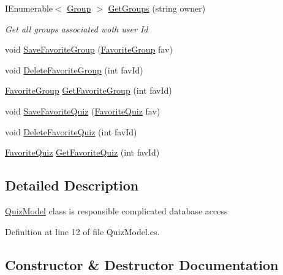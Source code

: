 \begin{DoxyCompactItemize}
I\+Enumerable$<$ \hyperlink{class_website_1_1_models_1_1_group}{Group} $>$ \hyperlink{class_website_1_1_models_1_1_quiz_model_a16f6ac52bca29f569a4c403d9fdcdd29}{Get\+Groups} (string owner)
\begin{DoxyCompactList}\small\item\em Get all groups associated woth user Id \end{DoxyCompactList}\item 
void \hyperlink{class_website_1_1_models_1_1_quiz_model_a91252f69e6932544dfb25fc0e8363f96}{Save\+Favorite\+Group} (\hyperlink{class_website_1_1_models_1_1_favorite_group}{Favorite\+Group} fav)
\item 
void \hyperlink{class_website_1_1_models_1_1_quiz_model_abd8bdee3dc3f89bc31938bbedab53d61}{Delete\+Favorite\+Group} (int fav\+Id)
\item 
\hyperlink{class_website_1_1_models_1_1_favorite_group}{Favorite\+Group} \hyperlink{class_website_1_1_models_1_1_quiz_model_a780db94cd67bde91ce1da00f9bce3725}{Get\+Favorite\+Group} (int fav\+Id)
\item 
void \hyperlink{class_website_1_1_models_1_1_quiz_model_a3543e265f984e14ad39b5b5613575bf2}{Save\+Favorite\+Quiz} (\hyperlink{class_website_1_1_models_1_1_favorite_quiz}{Favorite\+Quiz} fav)
\item 
void \hyperlink{class_website_1_1_models_1_1_quiz_model_a59cc47c3dd9fce3869282c34f193efa4}{Delete\+Favorite\+Quiz} (int fav\+Id)
\item 
\hyperlink{class_website_1_1_models_1_1_favorite_quiz}{Favorite\+Quiz} \hyperlink{class_website_1_1_models_1_1_quiz_model_a76519d4632d5f719350187809fb94990}{Get\+Favorite\+Quiz} (int fav\+Id)
\end{DoxyCompactItemize}


\subsection{Detailed Description}
\hyperlink{class_website_1_1_models_1_1_quiz_model}{Quiz\+Model} class is responsible complicated database access 



Definition at line 12 of file Quiz\+Model.\+cs.



\subsection{Constructor \& Destructor Documentation}
\hypertarget{class_website_1_1_models_1_1_quiz_model_ae9f893ec003a878e253927af5b2b789d}{}
